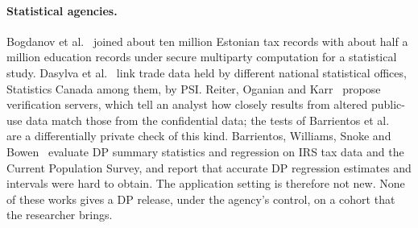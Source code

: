 \documentclass[11pt]{article}
\theoremstyle{definition}
\theoremstyle{plain}
\begin{document}
\paragraph{Statistical agencies.} Bogdanov et al.~\cite{bogdanov2016students} joined about ten million Estonian tax records with about half a million education records under secure multiparty computation for a statistical study. Dasylva et al.~\cite{dasylva2025linking} link trade data held by different national statistical offices, Statistics Canada among them, by PSI. Reiter, Oganian and Karr~\cite{reiter2009verification} propose verification servers, which tell an analyst how closely results from altered public-use data match those from the confidential data; the tests of Barrientos et al.~\cite{barrientos2019differentially} are a differentially private check of this kind. Barrientos, Williams, Snoke and Bowen~\cite{barrientos2024feasibility} evaluate DP summary statistics and regression on IRS tax data and the Current Population Survey, and report that accurate DP regression estimates and intervals were hard to obtain. The application setting is therefore not new. None of these works gives a DP release, under the agency's control, on a cohort that the researcher brings.
\end{document}
